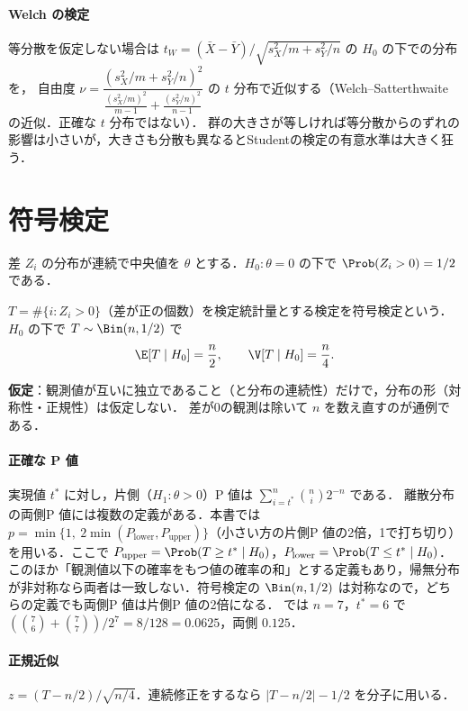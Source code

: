 \paragraph{Welch の検定}
等分散を仮定しない場合は $t_W=(\bar X-\bar Y)/\sqrt{s_X^2/m+s_Y^2/n}$ の $H_0$ の下での分布を，
自由度 $\nu=\dfrac{(s_X^2/m+s_Y^2/n)^2}{\frac{(s_X^2/m)^2}{m-1}+\frac{(s_Y^2/n)^2}{n-1}}$ の $t$ 分布で近似する（Welch--Satterthwaite の近似．正確な $t$ 分布ではない）．
群の大きさが等しければ等分散からのずれの影響は小さいが，大きさも分散も異なるとStudentの検定の有意水準は大きく狂う．

\section{符号検定}\label{sec:03-sign}
\Hissu 差 $Z_i$ の分布が連続で中央値を $\theta$ とする．$H_0:\theta=0$ の下で $\Prob(Z_i>0)=1/2$ である．
\begin{teigi}[符号検定]\label{def:03-sign}
$T=\#\{i:Z_i>0\}$（差が正の個数）を検定統計量とする検定を符号検定という．$H_0$ の下で $T\sim\Bin(n,1/2)$ で
\begin{equation}
\E[T\mid H_0]=\frac n2,\qquad \V[T\mid H_0]=\frac n4.\label{eq:03-signmoments}
\end{equation}
\end{teigi}
\textbf{仮定}：観測値が互いに独立であること（と分布の連続性）だけで，分布の形（対称性・正規性）は仮定しない．
差が0の観測は除いて $n$ を数え直すのが通例である．

\paragraph{正確な P 値}
実現値 $t^*$ に対し，片側（$H_1:\theta>0$）P 値は $\sum_{i=t^*}^{n}\binom ni2^{-n}$ である．
\Youchui 離散分布の両側P 値には複数の定義がある．本書では $p=\min\{1,\ 2\min(P_{\mathrm{lower}},P_{\mathrm{upper}})\}$（小さい方の片側P 値の2倍，1で打ち切り）を用いる．ここで $P_{\mathrm{upper}}=\Prob(T\ge t^*\mid H_0)$，$P_{\mathrm{lower}}=\Prob(T\le t^*\mid H_0)$．このほか「観測値以下の確率をもつ値の確率の和」とする定義もあり，帰無分布が非対称なら両者は一致しない．符号検定の $\Bin(n,1/2)$ は対称なので，どちらの定義でも両側P 値は片側P 値の2倍になる． では $n=7$，$t^*=6$ で
$(\binom76+\binom77)/2^7=8/128=0.0625$，両側 $0.125$．
\paragraph{正規近似}
$z=(T-n/2)/\sqrt{n/4}$．連続修正をするなら $|T-n/2|-1/2$ を分子に用いる．


